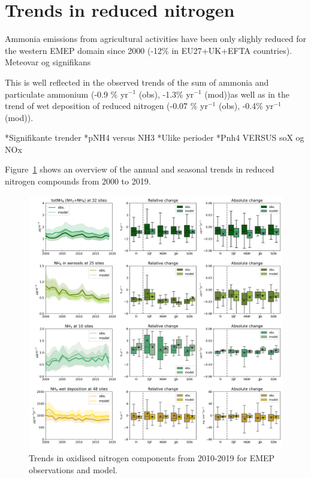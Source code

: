\section{\label{sec:Trends_reduced nitrogen }Trends in reduced nitrogen}
Ammonia emissions from agricultural activities have been only slighly reduced for the western EMEP domain since 2000 (-12\% in EU27+UK+EFTA countries). Meteovar og signifikans

This is well reflected in the observed trends of the sum of ammonia and particulate ammonium (-0.9 \% yr$^{-1}$ (obs), -1.3\% yr$^{-1}$ (mod))as well as in the trend of wet deposition of reduced nitrogen (-0.07 \% yr$^{-1}$ (obs), -0.4\% yr$^{-1}$ (mod)). 

*Signifikante trender
*pNH4 versus NH3
*Ulike perioder
*Pnh4 VERSUS soX og NOx

Figure~\ref{fig:Nred_trends} shows an overview of the annual and seasonal trends in reduced nitrogen compounds from 2000 to 2019.

\begin{figure}
	\centering
	\includegraphics[width=0.74\paperwidth]{FIGS_TRENDS/Nred_trends.png}
	\caption{\label{fig:Nred_trends}Trends in oxidised nitrogen components from 2010-2019 for EMEP observations and model.}
\end{figure}



